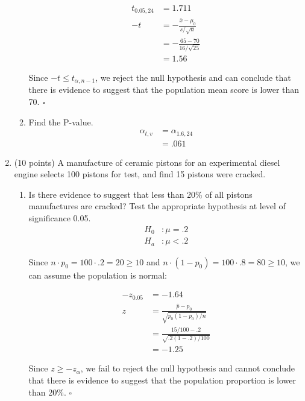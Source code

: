 \documentclass[12pt, letter]{article}
\newenvironment{nscenter}
	{\parskip=0pt\par\nopagebreak\centering}
	{\par\noindent\ignorespacesafterend}
\begin{document}
\begin{enumerate}
\begin{enumerate}
\begin{nscenter}
		\end{nscenter}
		\begin{align*}
			t_{0.05, 24} &= 1.711 \\
			-t &= -\frac{\bar{x} - \mu_{0}}{s / \sqrt{n}} \\
			&= -\frac{65 - 70}{16 / \sqrt{25}} \\
			&= 	1.56
		\end{align*}
		\begin{nscenter}
			Since $-t \leq t_{\alpha, n-1}$, we reject the null hypothesis and can conclude that there is evidence to suggest that the population mean score is lower than 70. $\square$
		\end{nscenter}
		\pagebreak
		\item Find the P-value.
		\begin{align*}
			\alpha_{t, v} &= \alpha_{1.6, 24} \\
			&= \boxed{.061}
		\end{align*}
	\end{enumerate}
	\setcounter{enumi}{13}
	\item (10 points) A manufacture of ceramic pistons for an experimental diesel engine selects 100 pistons for test, and find 15 pistons were cracked.
	\begin{enumerate}
		\item Is there evidence to suggest that less than 20\% of all pistons manufactures are cracked? Test the appropriate hypothesis at level of significance 0.05.
		\begin{align*}
			H_{0}&: \mu = .2 \\
			H_{a}&: \mu < .2
		\end{align*}
		\begin{nscenter}
			Since $n \cdot p_{0} = 100 \cdot .2 = 20 \geq 10$ and $n \cdot (1-p_{0}) = 100 \cdot .8 = 80 \geq 10$, we can assume the population is normal:
		\end{nscenter}
		\begin{align*}
			-z_{0.05} &= -1.64 \\
			z &= \frac{\hat{p} - p_{0}}{\sqrt{p_{0}(1-p_{0}) / n}} \\
			&= \frac{15/100 - .2}{\sqrt{.2(1-.2) / 100}} \\
			&= -1.25
		\end{align*}
		\begin{nscenter}
			Since $z \geq -z_{\alpha}$, we fail to reject the null hypothesis and cannot conclude that there is evidence to suggest that the population proportion is lower than 20\%. $\square$

\end{nscenter}
\end{enumerate}
\end{enumerate}
\end{document}
